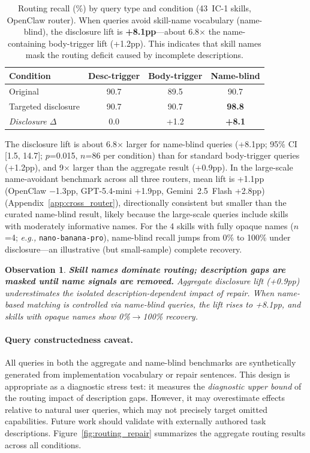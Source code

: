 \documentclass[11pt]{article}
\newtheorem{observation}{Observation}
\newcommand{\eg}{\textit{e.g.,}\xspace}
\begin{document}
\begin{table}[t]
\centering\small
\begin{tabular}{lccc}
\toprule
\textbf{Condition}
  & \textbf{Desc-trigger}
  & \textbf{Body-trigger}
  & \textbf{Name-blind} \\
\midrule
Original            & 90.7 & 89.5 & 90.7 \\
Targeted disclosure & 90.7 & 90.7 & \textbf{98.8} \\
\midrule
\emph{Disclosure $\Delta$} & 0.0 & +1.2 & \textbf{+8.1} \\
\bottomrule
\end{tabular}
\caption{Routing recall (\%) by query type and condition
(43~IC-1 skills, OpenClaw router).
When queries avoid skill-name vocabulary (name-blind),
the disclosure lift is \textbf{+8.1pp}---about 6.8$\times$
the name-containing body-trigger lift (+1.2pp).
This indicates that skill names mask the routing
deficit caused by incomplete descriptions.}
\label{tab:blind_routing}
\end{table}

The disclosure lift is about 6.8$\times$ larger for name-blind
queries (+8.1pp; 95\% CI [1.5, 14.7]; $p$=0.015, $n$=86
per condition) than for standard body-trigger queries
(+1.2pp), and 9$\times$ larger than the aggregate
result (+0.9pp).
In the large-scale name-avoidant benchmark across all
three routers, mean lift is +1.1pp (OpenClaw $-$1.3pp,
GPT-5.4-mini +1.9pp, Gemini~2.5~Flash +2.8pp)
(Appendix~\ref{app:cross_router}), directionally
consistent but smaller than the curated name-blind
result, likely because the large-scale queries
include skills with moderately informative names.
For the 4 skills with fully opaque names ($n$=4; \eg
\texttt{nano-banana-pro}), name-blind recall jumps
from 0\% to 100\% under disclosure---an illustrative
(but small-sample) complete recovery.

\begin{observation}
\textbf{Skill names dominate routing; description gaps
are masked until name signals are removed.}
Aggregate disclosure lift (+0.9pp) underestimates the
isolated description-dependent impact of repair.
When name-based matching is controlled via name-blind
queries, the lift rises to +8.1pp, and skills with
opaque names show 0\%$\to$100\% recovery.
\end{observation}

\paragraph{Query constructedness caveat.}
All queries in both the aggregate and name-blind benchmarks
are synthetically generated from implementation vocabulary
or repair sentences.
This design is appropriate as a diagnostic stress test:
it measures the \emph{diagnostic upper bound} of the routing impact of
description gaps.
However, it may overestimate effects relative to
natural user queries, which may not precisely target
omitted capabilities.
Future work should validate with externally authored
task descriptions.
Figure~\ref{fig:routing_repair} summarizes the
aggregate routing results across all conditions.
\end{document}
